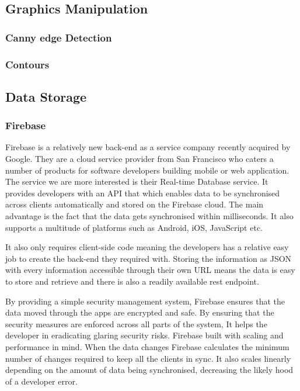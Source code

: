 \subsection{Graphics Manipulation} 
\subsubsection{Canny edge Detection}
\subsubsection{Contours}

\subsection{Data Storage}
\subsubsection{Firebase}

Firebase\cite{firebase} is a relatively new back-end as a service
company recently acquired by Google. They are a cloud service provider
from San Francisco who caters a number of products for software developers
building mobile or web application. The service we are more interested
is their Real-time Database service. It provides developers with an
API that which enables data to be synchronised across clients automatically
and stored on the Firebase cloud. The main advantage is the fact that
the data gets synchronised within milliseconds. It also supports a
multitude of platforms such as Android, iOS, JavaScript etc.

It also only requires client-side code meaning the developers has
a relative easy job to create the back-end they required with. Storing
the information as JSON with every information accessible through
their own URL means the data is easy to store and retrieve and there
is also a readily available rest endpoint. 

By providing a simple security management system, Firebase ensures
that the data moved through the apps are encrypted and safe. By ensuring
that the security measures are enforced across all parts of the system,
It helps the developer in eradicating glaring security risks. Firebase
built with scaling and performance in mind. When the data changes
Firebase calculates the minimum number of changes required to keep
all the clients in sync. It also scales linearly depending on the
amount of data being synchronised, decreasing the likely hood of a
developer error. 

